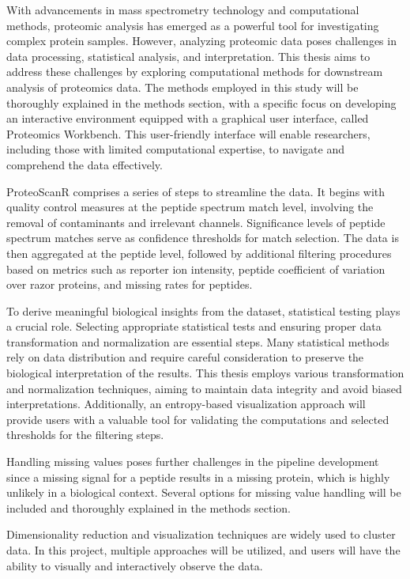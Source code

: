 \documentclass[
  11pt,
]{article}
\begin{document}
With advancements in mass spectrometry technology and computational methods, proteomic analysis has emerged as a powerful tool for investigating complex protein samples. However, analyzing proteomic data poses challenges in data processing, statistical analysis, and interpretation. This thesis aims to address these challenges by exploring computational methods for downstream analysis of proteomics data. The methods employed in this study will be thoroughly explained in the methods section, with a specific focus on developing an interactive environment equipped with a graphical user interface, called Proteomics Workbench. This user-friendly interface will enable researchers, including those with limited computational expertise, to navigate and comprehend the data effectively.

ProteoScanR comprises a series of steps to streamline the data. It begins with quality control measures at the peptide spectrum match level, involving the removal of contaminants and irrelevant channels. Significance levels of peptide spectrum matches serve as confidence thresholds for match selection. The data is then aggregated at the peptide level, followed by additional filtering procedures based on metrics such as reporter ion intensity, peptide coefficient of variation over razor proteins, and missing rates for peptides.

To derive meaningful biological insights from the dataset, statistical testing plays a crucial role. Selecting appropriate statistical tests and ensuring proper data transformation and normalization are essential steps. Many statistical methods rely on data distribution and require careful consideration to preserve the biological interpretation of the results. This thesis employs various transformation and normalization techniques, aiming to maintain data integrity and avoid biased interpretations. Additionally, an entropy-based visualization approach will provide users with a valuable tool for validating the computations and selected thresholds for the filtering steps.

Handling missing values poses further challenges in the pipeline development since a missing signal for a peptide results in a missing protein, which is highly unlikely in a biological context. Several options for missing value handling will be included and thoroughly explained in the methods section.

Dimensionality reduction and visualization techniques are widely used to cluster data. In this project, multiple approaches will be utilized, and users will have the ability to visually and interactively observe the data.
\end{document}
